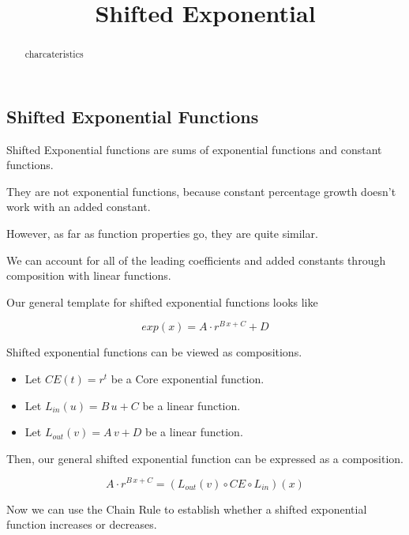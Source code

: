 \documentclass{ximera}
\title{Shifted Exponential}
\begin{document}
\begin{abstract}
charcateristics
\end{abstract}
\maketitle












\subsection*{Shifted Exponential Functions}


Shifted Exponential functions are sums of exponential functions and constant functions. 

They are not exponential functions, because constant percentage growth doesn't work with an added constant. 

However, as far as function properties go, they are quite similar.

We can account for all of the leading coefficients and added constants through composition with linear functions. 





Our general template for shifted exponential functions looks like

\[
exp(x) = A \cdot r^{B \, x + C} + D
\]


Shifted exponential functions can be viewed as compositions.



\begin{itemize}
\item Let $CE(t)=r^t$ be a Core exponential function.
\item Let $L_{in}(u) = B \, u + C$ be a linear function.
\item Let $L_{out}(v) = A \, v + D$ be a linear function.
\end{itemize}

Then, our general shifted exponential function can be expressed as a composition.


\[
 A \cdot r^{B \, x + C} = (L_{out}(v) \circ CE \circ L_{in})(x)
\]



Now we can use the Chain Rule to establish whether a shifted exponential function increases or decreases.
\end{document}
